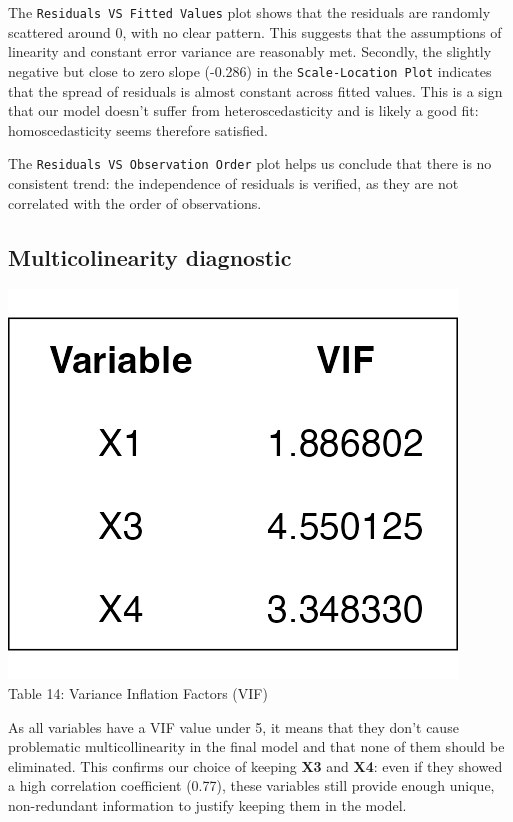\documentclass[
  11pt,
]{article}
\begin{document}
The \texttt{Residuals\ VS\ Fitted\ Values} plot shows that the residuals
are randomly scattered around 0, with no clear pattern. This suggests
that the assumptions of linearity and constant error variance are
reasonably met. Secondly, the slightly negative but close to zero slope
(-0.286) in the \texttt{Scale-Location\ Plot} indicates that the spread
of residuals is almost constant across fitted values. This is a sign
that our model doesn't suffer from heteroscedasticity and is likely a
good fit: homoscedasticity seems therefore satisfied.

The \texttt{Residuals\ VS\ Observation\ Order} plot helps us conclude
that there is no consistent trend: the independence of residuals is
verified, as they are not correlated with the order of observations.

\subsection{Multicolinearity
diagnostic}\label{multicolinearity-diagnostic}

\begin{minipage}{0.2\textwidth}
\centering
\includegraphics[width=0.9\linewidth]{vif_table.png}\\
\small Table 14: Variance Inflation Factors (VIF)
\end{minipage}
\hfill
\begin{minipage}{0.8\textwidth}
\small
As all variables have a VIF value under 5, it means that they don’t cause problematic multicollinearity in the final model and that none of them should be eliminated. This confirms our choice of keeping \textbf{X3} and \textbf{X4}: even if they showed a high correlation coefficient (0.77), these variables still provide enough unique, non-redundant information to justify keeping them in the model.
\end{minipage}
\end{document}
